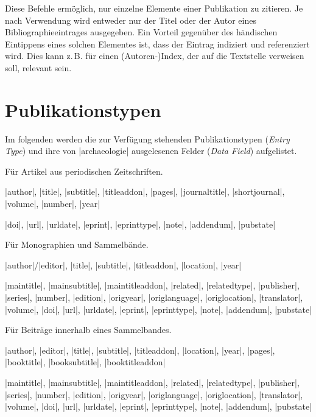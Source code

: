 \documentclass[a4paper,10pt,ngerman]{ltxdoc}
\begin{document}
\DescribeMacro{\citeauthor}  \DescribeMacro{\citetitle}  Diese Befehle ermöglich, nur einzelne Elemente einer Publikation zu zitieren. Je nach Verwendung wird entweder nur der Titel oder der Autor eines Bibliographieeintrages ausgegeben. Ein Vorteil gegenüber des händischen Eintippens eines solchen Elementes ist, dass der Eintrag indiziert und referenziert wird. Dies kann z.\,B. für einen (Autoren-)Index, der auf die Textstelle verweisen soll, relevant sein.
   

\section{Publikationstypen}
Im folgenden werden die zur Verfügung stehenden Publikationstypen (\emph{Entry Type}) und ihre von |archaeologie| ausgelesenen Felder (\emph{Data Field}) aufgelistet.

  Für Artikel aus periodischen Zeitschriften.
\begin{description}[topsep=0pt] 
\item[Notwendig:] |author|, |title|, |subtitle|,  |titleaddon|, |pages|, |journaltitle|, |shortjournal|, |volume|, |number|, |year|
\item[Optional:] |doi|, |url|, |urldate|, |eprint|, |eprinttype|, |note|, |addendum|, |pubstate|
\end{description}



    Für Monographien und Sammelbände.
\begin{description}[topsep=0pt]
\item[Notwendig:] |author|/|editor|, |title|, |subtitle|, |titleaddon|, |location|, |year|
\item[Optional:] |maintitle|, |mainsubtitle|, |maintitleaddon|, |related|, |relatedtype|, |publisher|, |series|, |number|, |edition|, |origyear|, |origlanguage|, |origlocation|, |translator|, |volume|, |doi|, |url|, |urldate|, |eprint|, |eprinttype|, |note|, |addendum|, |pubstate|
\end{description}


 
    Für Beiträge innerhalb eines Sammelbandes.
\begin{description}[topsep=0pt]
\item[Notwendig:] |author|, |editor|, |title|, |subtitle|, |titleaddon|, |location|, |year|, |pages|, |booktitle|, |booksubtitle|, |booktitleaddon|
\item[Optional:] |maintitle|, |mainsubtitle|, |maintitleaddon|, |related|, |relatedtype|, |publisher|, |series|, |number|, |edition|, |origyear|, |origlanguage|, |origlocation|, |translator|, |volume|, |doi|, |url|, |urldate|, |eprint|, |eprinttype|, |note|, |addendum|, |pubstate|
\end{description}
\end{document}

